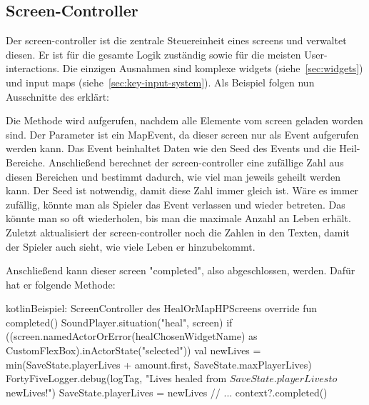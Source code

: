 \renewcommand{\kapitelautor}{Autor: Felix Zwickelstorfer}
\subsection{Screen-Controller}\label{subsec:screen-controller}
\renewcommand{\kapitelautor}{Autor: Felix Zwickelstorfer}

Der screen-controller ist die zentrale Steuereinheit eines screens und verwaltet diesen.
Er ist für die gesamte Logik zuständig sowie für die meisten User-interactions.
Die einzigen Ausnahmen sind komplexe widgets (siehe~\ref{sec:widgets}) und input maps (siehe~\ref{sec:key-input-system}).
Als Beispiel folgen nun Ausschnitte des  erklärt:



Die  Methode wird aufgerufen, nachdem alle Elemente vom screen geladen worden sind.
Der Parameter  ist ein MapEvent, da dieser screen nur als Event aufgerufen werden kann.
Das Event beinhaltet Daten wie den Seed des Events und die Heil-Bereiche.
Anschließend berechnet der screen-controller eine zufällige Zahl aus diesen Bereichen und bestimmt dadurch, wie viel man jeweils geheilt werden kann.
Der Seed ist notwendig, damit diese Zahl immer gleich ist.
Wäre es immer zufällig, könnte man als Spieler das Event verlassen und wieder betreten.
Das könnte man so oft wiederholen, bis man die maximale Anzahl an Leben erhält.
Zuletzt aktualisiert der screen-controller noch die Zahlen in den Texten, damit der Spieler auch sieht, wie viele Leben er hinzubekommt.

Anschließend kann dieser screen "completed", also abgeschlossen, werden.
Dafür hat er folgende Methode:
\begin{codeBlock}{kotlin}{Beispiel: Screen\-Controller des HealOrMapHP\-Screens}
    override fun completed() {
        SoundPlayer.situation("heal", screen)
        if ((screen.namedActorOrError(healChosenWidgetName) as CustomFlexBox).inActorState("selected")) {
            val newLives = min(SaveState.playerLives + amount.first, SaveState.maxPlayerLives)
            FortyFiveLogger.debug(logTag, "Lives healed from ${SaveState.playerLives} to $newLives!")
            SaveState.playerLives = newLives
        }
        // ...
        context?.completed()
    }
\end{codeBlock}

